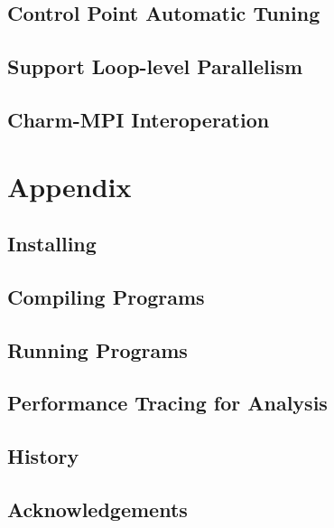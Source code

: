 \documentclass[10pt]{report}
\begin{document}
\chapter{Control Point Automatic Tuning}
\label{sec:controlpoint}
  

\chapter{Support Loop-level Parallelism}
\label{sec:ckloop}


\chapter{Charm-MPI Interoperation}
\label{sec:interop}
  

\part{Appendix}
\appendix

%

\chapter{Installing \charm}
\label{sec:install}
  

\chapter{Compiling \charm Programs}
\label{sec:compile}
  

\chapter{Running \charm Programs}
\label{sec:run}
  

\chapter{Performance Tracing for Analysis}
\label{sec:trace-projections}
  


\chapter{History}
  

\chapter {Acknowledgements}
  


\end{document}

